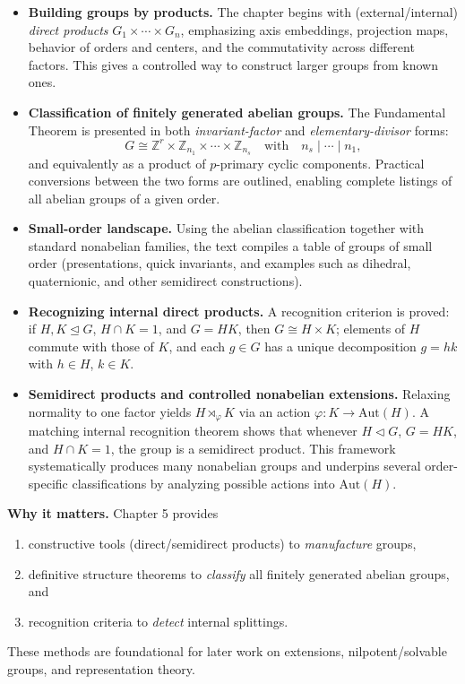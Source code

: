 \documentclass[11pt]{article}
\theoremstyle{definition}
\newcommand{\Aut}{\mathrm{Aut}}
\begin{document}
\begin{itemize}
  \item \textbf{Building groups by products.}
  The chapter begins with (external/internal) \emph{direct products} $G_1\times\cdots\times G_n$, emphasizing axis embeddings, projection maps, behavior of orders and centers, and the commutativity across different factors. This gives a controlled way to construct larger groups from known ones.

  \item \textbf{Classification of finitely generated abelian groups.}
  The Fundamental Theorem is presented in both \emph{invariant-factor} and \emph{elementary-divisor} forms:
  \[
    G \cong \mathbb{Z}^r \times \mathbb{Z}_{n_1}\times\cdots\times \mathbb{Z}_{n_s}
    \quad\text{with}\quad n_{s}\mid\cdots\mid n_1,
  \]
  and equivalently as a product of $p$-primary cyclic components. Practical conversions between the two forms are outlined, enabling complete listings of all abelian groups of a given order.

  \item \textbf{Small-order landscape.}
  Using the abelian classification together with standard nonabelian families, the text compiles a table of groups of small order (presentations, quick invariants, and examples such as dihedral, quaternionic, and other semidirect constructions).

  \item \textbf{Recognizing internal direct products.}
  A recognition criterion is proved: if $H,K\trianglelefteq G$, $H\cap K=1$, and $G=HK$, then $G\cong H\times K$; elements of $H$ commute with those of $K$, and each $g\in G$ has a unique decomposition $g=hk$ with $h\in H$, $k\in K$.

  \item \textbf{Semidirect products and controlled nonabelian extensions.}
  Relaxing normality to one factor yields $H\rtimes_\varphi K$ via an action $\varphi:K\to\Aut(H)$. A matching internal recognition theorem shows that whenever $H\lhd G$, $G=HK$, and $H\cap K=1$, the group is a semidirect product. This framework systematically produces many nonabelian groups and underpins several order-specific classifications by analyzing possible actions into $\Aut(H)$.
\end{itemize}

\noindent\textbf{Why it matters.} Chapter 5 provides
\begin{enumerate}\itemsep3pt
  \item constructive tools (direct/semidirect products) to \emph{manufacture} groups,
  \item definitive structure theorems to \emph{classify} all finitely generated abelian groups, and
  \item recognition criteria to \emph{detect} internal splittings.
\end{enumerate}
These methods are foundational for later work on extensions, nilpotent/solvable groups, and representation theory.
\end{document}

